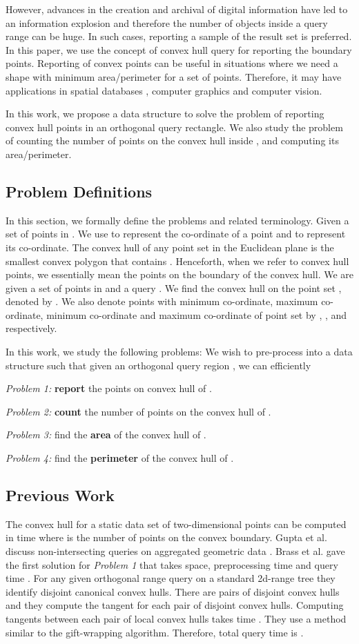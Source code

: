 \documentclass[runningheads,a4paper]{llncs}
\begin{document}
However, advances in the creation and archival of digital information have led
to an information explosion and therefore the number of objects inside a query
range can be huge. In such cases, reporting a sample of the result set is
preferred. In this paper, we use the concept of convex hull query for
reporting the boundary points. Reporting of convex points can be useful in
situations where we need a shape with minimum area/perimeter for a set of
points. Therefore, it may have applications in spatial databases \cite{Tao}, computer graphics and computer
vision.

In this work, we propose a data structure to solve the problem of reporting
convex hull points in an orthogonal query rectangle.  We also study the
problem of counting the number of points on the convex hull inside ,
and computing its area/perimeter.
\subsection{Problem Definitions}
\label{def}
In this section, we formally define the problems and related terminology.
Given a set of  points  in
. We use  to represent the  co-ordinate of a point
 and  to represent its  co-ordinate.
The convex hull of any point set  
in the Euclidean plane is the smallest convex polygon that contains .
Henceforth, when we refer to convex hull points,
we essentially mean the points on the boundary of the convex hull.
We are given a set  of  points in  and a query .
We find the convex hull on the point set , denoted by . We also denote points with minimum 
co-ordinate, maximum  co-ordinate, minimum  co-ordinate and maximum  co-ordinate of point set 
by , ,  and  respectively. 

In this work, we study the following problems:
 We wish to pre-process 
into a data structure such that given an orthogonal query region , we can efficiently

{\em Problem 1:} {\bf report} the points on convex hull of .

{\em Problem 2:} {\bf count} the number of points on the convex hull of .

{\em Problem 3:} find the {\bf area} of the convex hull of .

{\em Problem 4:} find the {\bf perimeter} of the convex hull of .
\subsection{Previous Work} \label{prev-work} The convex hull for a static data
set of two-dimensional points can be computed in  time
\cite{opchan} where  is the number of points on the convex boundary.
Gupta et al. discuss non-intersecting queries on aggregated geometric data \cite{gupta}.
Brass et al. gave the first solution for {\em Problem 1} that takes  space,  preprocessing time and  query
time \cite{brass}.  For any given orthogonal range query on a standard
2d-range tree they identify  disjoint canonical convex
hulls. There are  pairs of disjoint convex hulls and they
compute the tangent for each pair of disjoint convex hulls.  Computing
tangents between each pair of local convex hulls takes  time \cite{kirkpatrick}. They
use a method similar to the gift-wrapping algorithm.  Therefore, total query
time is .
\end{document}
